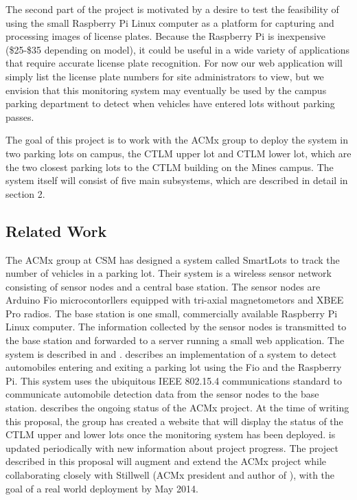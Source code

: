 \documentclass[11pt, oneside, fullpage, doublespace]{article}
\begin{document}
The second part of the project is motivated by a desire to test the feasibility of using the small Raspberry Pi Linux computer as a platform for capturing and processing images of license plates. Because the Raspberry Pi is inexpensive (\$25-\$35 depending on model), it could be useful in a wide variety of applications that require accurate license plate recognition. For now our web application will simply list the license plate numbers for site administrators to view, but we envision that this monitoring system may eventually be used by the campus parking department to detect when vehicles have entered lots without parking passes.

The goal of this project is to work with the ACMx group to deploy the system in two parking lots on campus, the CTLM upper lot and CTLM lower lot, which are the two closest parking lots to the CTLM building on the Mines campus. The system itself will consist of five main subsystems, which are described in detail in section 2.

\subsection{Related Work}
The ACMx group at CSM has designed a system called SmartLots to track the number of vehicles in a parking lot. Their system is a wireless sensor network consisting of sensor nodes and a central base station. The sensor nodes are Arduino Fio microcontorllers equipped with tri-axial magnetometors and XBEE Pro radios. The base station is one small, commercially available Raspberry Pi Linux computer. The information collected by the sensor nodes is transmitted to the base station and forwarded to a server running a small web application. The system is described in \cite{stillwell2013} and \cite{parkingWiki}. \cite{stillwell2013} describes an implementation of a system to detect automobiles entering and exiting a parking lot using the Fio and the Raspberry Pi. This system uses the ubiquitous IEEE 802.15.4 communications standard to communicate automobile detection data from the sensor nodes to the base station. \cite{parkingWiki} describes the ongoing status of the ACMx project. At the time of writing this proposal, the group has created a website that will display the status of the CTLM upper and lower lots once the monitoring system has been deployed. \cite{parkingWiki} is updated periodically with new information about project progress. The project described in this proposal will augment and extend the ACMx project while collaborating closely with Stillwell (ACMx president and author of \cite{stillwell2013}), with the goal of a real world deployment by May 2014.
\end{document}
